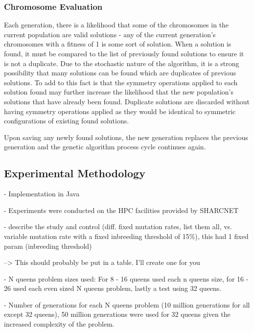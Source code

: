 \documentclass{sig-alternate}
\begin{document}
\subsubsection{Chromosome Evaluation}
Each generation, there is a likelihood that some of the chromosomes in the current population are valid solutions - any of the current generation's chromosomes with a fitness of 1 is some sort of solution. When a solution is found, it must be compared to the list of previously found solutions to ensure it is not a duplicate. Due to the stochastic nature of the algorithm, it is a strong possibility that many solutions can be found which are duplicates of previous solutions. To add to this fact is that the symmetry operations applied to each solution found may further increase the likelihood that the new population's solutions that have already been found. Duplicate solutions are discarded without having symmetry operations applied as they would be identical to symmetric configurations of existing found solutions.

Upon saving any newly found solutions, the new generation replaces the previous generation and the genetic algorithm process cycle continues again.

\subsection{Experimental Methodology}

- Implementation in Java

- Experiments were conducted on the HPC facilities provided by SHARCNET

- describe the study and control (diff. fixed mutation rates, list them all, vs.
  variable mutation rate with a fixed inbreeding threshold of 15\%), this had
  1 fixed param (inbreeding threshold)
  
  --> This should probably be put in a table. I'll create one for you


- N queens problem sizes used: For 8 - 16 queens used each n queens size, for
  16 - 26 used each even sized N queens problem, lastly a test using 32 queens.

- Number of generations for each N queens problem (10 million generations for
  all except 32 queens), 50 million generations were used for 32 queens given
  the increased complexity of the problem.
\end{document}
